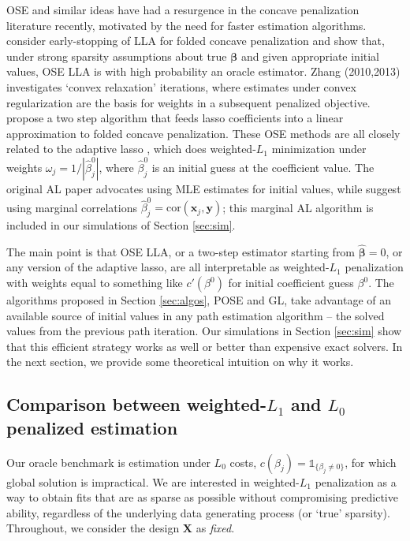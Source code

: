 \documentclass[12pt]{article}
\newcommand{\bs}[1]{\boldsymbol{#1}}
\newcommand{\mr}[1]{\mathrm{#1}}
\newcommand{\bm}[1]{\mathbf{#1}}
\newcommand{\ds}[1]{\mathds{#1}}
\begin{document}
OSE and similar ideas have had a resurgence in the concave penalization
literature recently, motivated by the need for faster estimation algorithms.
\cite{fan_strong_2014} consider early-stopping of LLA for folded concave
penalization  and show that, under strong sparsity assumptions about true
$\bs{\beta}$ and given appropriate initial values, OSE LLA is with high
probability an oracle estimator.   Zhang (2010,2013)
\nocite{zhang_analysis_2010,zhang_multi-stage_2013} investigates  
`convex relaxation' iterations, where estimates under convex regularization
 are the basis for weights in a subsequent penalized objective.
 \cite{wang_calibrating_2013} propose a two step algorithm that feeds lasso
 coefficients into a linear approximation to folded concave penalization.
 These OSE methods are all closely related to  the adaptive lasso
\citep[AL;][]{zou_adaptive_2006}, which does weighted-$L_1$ minimization under
weights $\omega_j = 1/|\hat\beta^0_j|$, where $\hat\beta^0_j$ is an initial
guess at the coefficient value.  The original AL paper advocates using MLE
estimates for initial values, while
\cite{huang_adaptive_2008} suggest using marginal correlations
$\hat\beta^0_j = \mr{cor}(\bm{x}_j,\bm{y})$; this marginal AL algorithm is included in our simulations of Section \ref{sec:sim}.

The main point is that OSE LLA, or a two-step estimator starting from
$\bs{\hat\beta}=0$, or any version of the adaptive lasso, are all  interpretable as weighted-$L_1$ 
penalization with weights equal to something like $c'(\beta^0)$ for initial
coefficient guess $\beta^0$. The algorithms proposed in Section \ref{sec:algos}, POSE and GL, take advantage of an  available
source of initial values in any path estimation algorithm -- the solved values
from the previous path iteration.  Our  simulations in Section \ref{sec:sim}
show that this efficient strategy works as well or better than  expensive
exact solvers.  In the next section, we provide some theoretical intuition on
why it works.


\subsection{Comparison between weighted-$L_1$ and $L_0$ penalized estimation}


Our oracle benchmark is estimation under $L_0$ costs, $c(\beta_j) =
\ds{1}_{\{\beta_j\neq0\}}$, for which global solution is impractical.   We are
interested in weighted-$L_1$ penalization as a way to obtain fits that are as
sparse as possible without compromising predictive ability, regardless of the
underlying data generating process (or `true' sparsity).  Throughout, we consider the design $\bm{X}$ as {\it fixed}.
\end{document}
